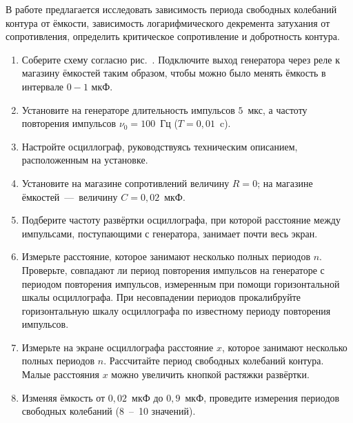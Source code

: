 \begin{lab:task}

В работе предлагается исследовать зависимость периода свободных колебаний контура от ёмкости, зависимость логарифмического декремента затухания от сопротивления, определить критическое сопротивление и добротность контура.

	\begin{enumerate}


	\item Соберите схему согласно рис.~. Подключите выход генератора через реле к магазину ёмкостей таким образом, чтобы можно было менять ёмкость в интервале $0 - 1$ мкФ.

	\item Установите на генераторе длительность импульсов $5$~мкс, а частоту
повторения импульсов $\nu_0 = 100$~Гц ($T = 0,01$~c).

	\item Настройте осциллограф, руководствуясь техническим описанием, расположенным на установке.


	\item Установите на магазине сопротивлений величину $R = 0$; на магазине ёмкостей~---~величину $C = 0,02$~мкФ.

	\item Подберите частоту развёртки осциллографа, при которой расстояние между импульсами, поступающими с генератора, занимает почти весь экран.

	\item Измерьте расстояние, которое занимают несколько полных периодов $n$. Проверьте, совпадают ли период повторения импульсов на генераторе с периодом повторения импульсов, измеренным при помощи горизонтальной шкалы осциллографа. При несовпадении периодов прокалибруйте горизонтальную шкалу осциллографа по известному периоду повторения импульсов.

	\item Измерьте на экране осциллографа расстояние $x$, которое занимают несколько полных периодов $n$. Рассчитайте период свободных колебаний контура. Малые расстояния $x$ можно увеличить кнопкой растяжки развёртки.

	\item Изменяя ёмкость от $0,02$~мкФ до $0,9$~мкФ, проведите измерения периодов свободных колебаний (8~--~10 значений).


\end{enumerate}
\end{lab:task}
